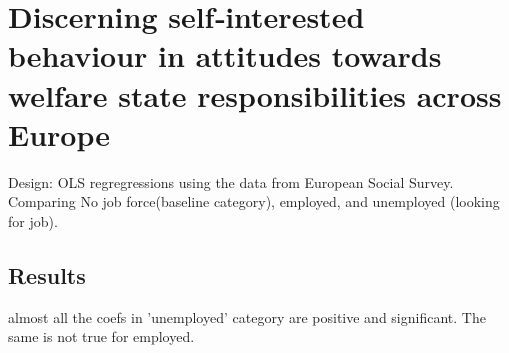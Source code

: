 \section{Discerning self‐interested behaviour in attitudes towards welfare state responsibilities across Europe \cite{baslevent_discerning_2011}}

Design: OLS regregressions using the data from European Social Survey. 
Comparing No job force(baseline category), employed, and unemployed (looking for job).

\subsection{Results}
almost all the coefs in 'unemployed' category are positive and significant. The same is not true for employed.

